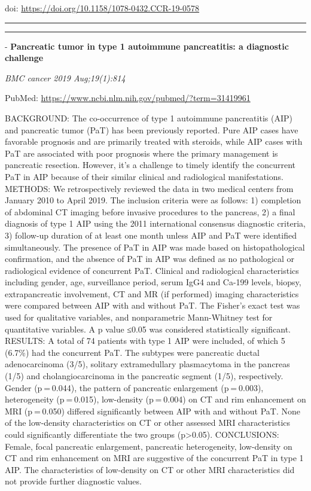 \documentclass[]{article}
\begin{document}
doi: \url{https://doi.org/10.1158/1078-0432.CCR-19-0578}

{}

{}

\begin{center}\rule{0.5\linewidth}{\linethickness}\end{center}

\begin{center}\rule{0.5\linewidth}{\linethickness}\end{center}

 - \textbf{Pancreatic tumor in type 1 autoimmune pancreatitis: a
diagnostic challenge}

\emph{BMC cancer 2019 Aug;19(1):814}

PubMed: \url{https://www.ncbi.nlm.nih.gov/pubmed/?term=31419961}

BACKGROUND: The co-occurrence of type 1 autoimmune pancreatitis (AIP)
and pancreatic tumor (PaT) has been previously reported. Pure AIP cases
have favorable prognosis and are primarily treated with steroids, while
AIP cases with PaT are associated with poor prognosis where the primary
management is pancreatic resection. However, it's a challenge to timely
identify the concurrent PaT in AIP because of their similar clinical and
radiological manifestations. METHODS: We retrospectively reviewed the
data in two medical centers from January 2010 to April 2019. The
inclusion criteria were as follows: 1) completion of abdominal CT
imaging before invasive procedures to the pancreas, 2) a final diagnosis
of type 1 AIP using the 2011 international consensus diagnostic
criteria, 3) follow-up duration of at least one month unless AIP and PaT
were identified simultaneously. The presence of PaT in AIP was made
based on histopathological confirmation, and the absence of PaT in AIP
was defined as no pathological or radiological evidence of concurrent
PaT. Clinical and radiological characteristics including gender, age,
surveillance period, serum IgG4 and Ca-199 levels, biopsy,
extrapancreatic involvement, CT and MR (if performed) imaging
characteristics were compared between AIP with and without PaT. The
Fisher's exact test was used for qualitative variables, and
nonparametric Mann-Whitney test for quantitative variables. A p value
≤0.05 was considered statistically significant. RESULTS: A total of 74
patients with type 1 AIP were included, of which 5 (6.7\%) had the
concurrent PaT. The subtypes were pancreatic ductal adenocarcinoma
(3/5), solitary extramedullary plasmacytoma in the pancreas (1/5) and
cholangiocarcinoma in the pancreatic segment (1/5), respectively. Gender
(p = 0.044), the pattern of pancreatic enlargement (p = 0.003),
heterogeneity (p = 0.015), low-density (p = 0.004) on CT and rim
enhancement on MRI (p = 0.050) differed significantly between AIP with
and without PaT. None of the low-density characteristics on CT or other
assessed MRI characteristics could significantly differentiate the two
groups (p\textgreater{}0.05). CONCLUSIONS: Female, focal pancreatic
enlargement, pancreatic heterogeneity, low-density on CT and rim
enhancement on MRI are suggestive of the concurrent PaT in type 1 AIP.
The characteristics of low-density on CT or other MRI characteristics
did not provide further diagnostic values.
\end{document}
